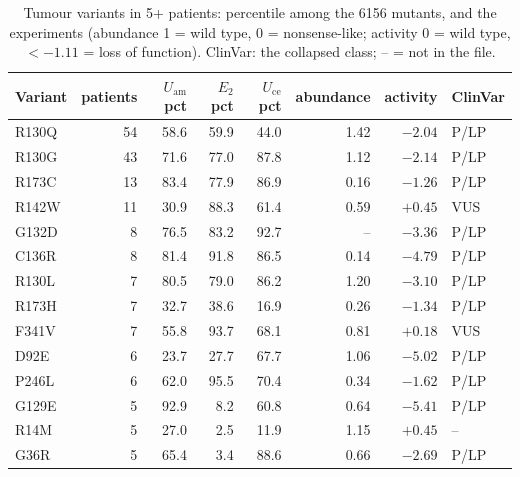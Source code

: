 \documentclass[11pt,a4paper]{article}
\newcommand{\Uam}{U_{\mathrm{am}}}
\newcommand{\Uce}{U_{\mathrm{ce}}}
\newcommand{\Etwo}{E_{2}}
\begin{document}
\begin{table}[H]
\centering\small
\begin{tabular}{@{}lrrrrrrl@{}}
\toprule
Variant & patients & $\Uam$ pct & $\Etwo$ pct & $\Uce$ pct & abundance & activity & ClinVar \\
\midrule
R130Q & 54 & 58.6 & 59.9 & 44.0 & 1.42 & $-2.04$ & P/LP \\
R130G & 43 & 71.6 & 77.0 & 87.8 & 1.12 & $-2.14$ & P/LP \\
R173C & 13 & 83.4 & 77.9 & 86.9 & 0.16 & $-1.26$ & P/LP \\
R142W & 11 & 30.9 & 88.3 & 61.4 & 0.59 & $+0.45$ & VUS \\
G132D & 8 & 76.5 & 83.2 & 92.7 & -- & $-3.36$ & P/LP \\
C136R & 8 & 81.4 & 91.8 & 86.5 & 0.14 & $-4.79$ & P/LP \\
R130L & 7 & 80.5 & 79.0 & 86.2 & 1.20 & $-3.10$ & P/LP \\
R173H & 7 & 32.7 & 38.6 & 16.9 & 0.26 & $-1.34$ & P/LP \\
F341V & 7 & 55.8 & 93.7 & 68.1 & 0.81 & $+0.18$ & VUS \\
D92E & 6 & 23.7 & 27.7 & 67.7 & 1.06 & $-5.02$ & P/LP \\
P246L & 6 & 62.0 & 95.5 & 70.4 & 0.34 & $-1.62$ & P/LP \\
G129E & 5 & 92.9 & 8.2 & 60.8 & 0.64 & $-5.41$ & P/LP \\
R14M & 5 & 27.0 & 2.5 & 11.9 & 1.15 & $+0.45$ & -- \\
G36R & 5 & 65.4 & 3.4 & 88.6 & 0.66 & $-2.69$ & P/LP \\
\bottomrule
\end{tabular}
\caption{Tumour variants in 5+ patients: percentile among the 6156 mutants,
and the experiments (abundance 1 = wild type, 0 = nonsense-like; activity 0 =
wild type, $<-1.11$ = loss of function). ClinVar: the collapsed class; -- = not in the file.}
\label{tab:hot}
\end{table}
\end{document}
